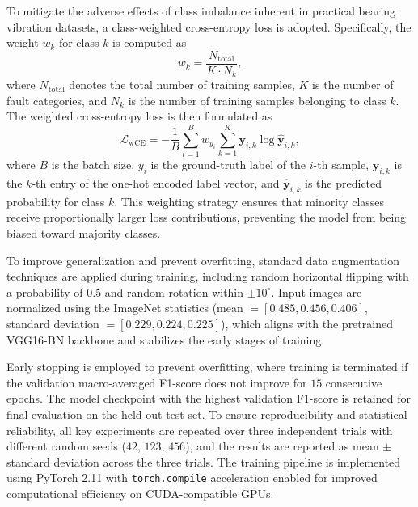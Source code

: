 \documentclass[journal]{IEEEtran}
\begin{document}
To mitigate the adverse effects of class imbalance inherent in practical bearing vibration datasets, a class-weighted cross-entropy loss is adopted. Specifically, the weight $w_k$ for class $k$ is computed as
\begin{equation}
w_k = \frac{N_{\mathrm{total}}}{K \cdot N_k},
\label{eq:class_weight}
\end{equation}
where $N_{\mathrm{total}}$ denotes the total number of training samples, $K$ is the number of fault categories, and $N_k$ is the number of training samples belonging to class $k$. The weighted cross-entropy loss is then formulated as
\begin{equation}
\mathcal{L}_{\mathrm{wCE}} = -\frac{1}{B} \sum_{i=1}^{B} w_{y_i} \sum_{k=1}^{K} \boldsymbol{y}_{i,k} \log \hat{\boldsymbol{y}}_{i,k},
\label{eq:weighted_ce}
\end{equation}
where $B$ is the batch size, $y_i$ is the ground-truth label of the $i$-th sample, $\boldsymbol{y}_{i,k}$ is the $k$-th entry of the one-hot encoded label vector, and $\hat{\boldsymbol{y}}_{i,k}$ is the predicted probability for class $k$. This weighting strategy ensures that minority classes receive proportionally larger loss contributions, preventing the model from being biased toward majority classes.

To improve generalization and prevent overfitting, standard data augmentation techniques are applied during training, including random horizontal flipping with a probability of $0.5$ and random rotation within $\pm 10^{\circ}$. Input images are normalized using the ImageNet statistics (mean $= [0.485, 0.456, 0.406]$, standard deviation $= [0.229, 0.224, 0.225]$), which aligns with the pretrained VGG16-BN backbone and stabilizes the early stages of training.

Early stopping is employed to prevent overfitting, where training is terminated if the validation macro-averaged F1-score does not improve for $15$ consecutive epochs. The model checkpoint with the highest validation F1-score is retained for final evaluation on the held-out test set. To ensure reproducibility and statistical reliability, all key experiments are repeated over three independent trials with different random seeds ($42$, $123$, $456$), and the results are reported as mean $\pm$ standard deviation across the three trials. The training pipeline is implemented using PyTorch 2.11 with \texttt{torch.compile} acceleration enabled for improved computational efficiency on CUDA-compatible GPUs.
\end{document}
